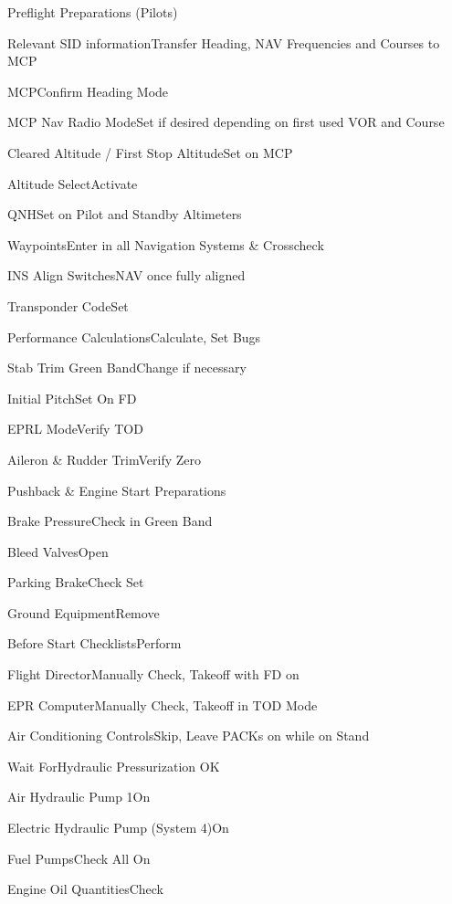 \documentclass[sim-use, blue_items]{checklist}
\begin{document}
\begin{checklist}{Preflight Preparations (Pilots)}
	\item{Relevant SID information}{Transfer Heading, NAV Frequencies and Courses to MCP}
	\item{MCP}{Confirm Heading Mode}
\end{checklist}

\begin{continuedchecklist}
	\item{MCP Nav Radio Mode}{Set if desired depending on first used VOR and Course}
	\item{Cleared Altitude / First Stop Altitude}{Set on MCP}
	\item{Altitude Select}{Activate}
	\item{QNH}{Set on Pilot and Standby Altimeters}
	\item{Waypoints}{Enter in all Navigation Systems \& Crosscheck}
	\item{INS Align Switches}{NAV once fully aligned}
	\item{Transponder Code}{Set}
	\item{Performance Calculations}{Calculate, Set Bugs}
	\item{Stab Trim Green Band}{Change if necessary}
	\item{Initial Pitch}{Set On FD}
	\item{EPRL Mode}{Verify TOD}
	\item{Aileron \& Rudder Trim}{Verify Zero}
\end{continuedchecklist}

\begin{checklist}{Pushback \& Engine Start Preparations}
	\item{Brake Pressure}{Check in Green Band}
	\item{Bleed Valves}{Open}
	\item{Parking Brake}{Check Set}
	\item{Ground Equipment}{Remove}
	\item{Before Start Checklists}{Perform}
	 {
		\item{Flight Director}{Manually Check, Takeoff with FD on}
		\item{EPR Computer}{Manually Check, Takeoff in TOD Mode}
		\item{Air Conditioning Controls}{Skip, Leave PACKs on while on Stand}
	}
	 {
		\item{Wait For}{Hydraulic Pressurization OK}
		\item{Air Hydraulic Pump 1}{On}
		\item{Electric Hydraulic Pump (System 4)}{On}
	}
	\item{Fuel Pumps}{Check All On}
	\item{Engine Oil Quantities}{Check}
\end{checklist}
\end{document}
